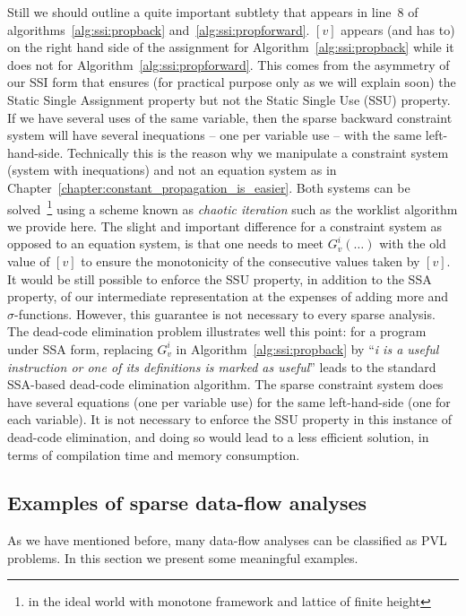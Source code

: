 Still we should outline a quite important subtlety that appears in line~8 of algorithms~\ref{alg:ssi:propback} and~\ref{alg:ssi:propforward}. $[v]$ appears (and has to) on the right hand side of the assignment for Algorithm~\ref{alg:ssi:propback} while it does not for Algorithm~\ref{alg:ssi:propforward}. This comes from the asymmetry of our SSI form that ensures (for practical purpose only as we will explain soon) the Static Single Assignment property but not the Static Single Use (SSU) property.
If we have several uses of the same variable, then the sparse backward constraint system will have several inequations -- one per variable use -- with the same left-hand-side.
Technically this is the reason why we manipulate a constraint system (system with inequations) and not an equation system as in Chapter~\ref{chapter:constant_propagation_is_easier}. Both systems can be solved~\footnote{in the ideal world with monotone framework and lattice of finite height} using a scheme known as \emph{chaotic iteration} such as the worklist algorithm we provide here. The slight and important difference for a constraint system as opposed to an equation system, is that one needs to meet $G_v^i(\dots)$ with the old value of $[v]$ to ensure the monotonicity of the consecutive values taken by $[v]$.
It would be still possible to enforce the SSU property, in addition to the SSA property, of our intermediate representation at the expenses of adding more \phiops and $\sigma$-functions.
However, this guarantee is not necessary to every sparse analysis.
The dead-code elimination problem illustrates well this point:
for a program under SSA form, replacing $G_v^i$ in Algorithm~\ref{alg:ssi:propback} by ``\emph{i is a useful instruction or one of its definitions is marked as useful}'' leads to the standard SSA-based dead-code elimination algorithm.
The sparse constraint system does have several equations (one per variable use) for the same left-hand-side (one for each variable).
It is not necessary to enforce the SSU property in this instance of dead-code elimination, and doing so would lead to a less efficient solution, in terms of compilation time and memory consumption.


\subsection{Examples of sparse data-flow analyses}
\label{sub:ssi:examples}

As we have mentioned before, many data-flow analyses can be classified as PVL problems.
In this section we present some meaningful examples.

